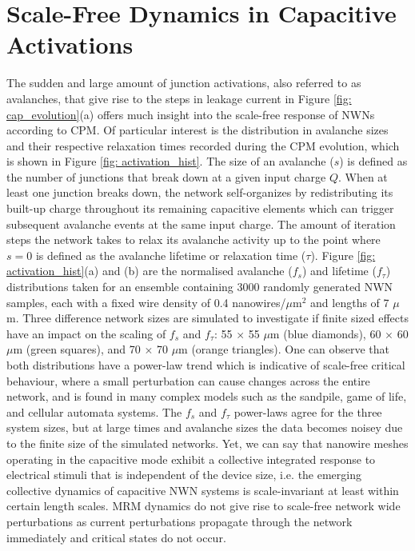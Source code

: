 \section{Scale-Free Dynamics in Capacitive Activations}
\label{Sec: cpm_avalanches}
The sudden and large amount of junction activations, also referred to as avalanches, that give rise to the steps in leakage current in Figure \ref{fig: cap_evolution}(a) offers much insight into the scale-free response of NWNs according to CPM. Of particular interest is the distribution in avalanche sizes and their respective relaxation times recorded during the CPM evolution, which is shown in Figure \ref{fig: activation_hist}. The size of an avalanche ($s$) is defined as the number of junctions that break down at a given input charge $Q$. When at least one junction breaks down, the network self-organizes by redistributing its built-up charge throughout its remaining capacitive elements which can trigger subsequent avalanche events at the same input charge. The amount of iteration steps the network takes to relax its avalanche activity up to the point where $s = 0$ is defined as the avalanche lifetime or relaxation time ($\tau$). Figure \ref{fig: activation_hist}(a) and (b) are the normalised avalanche ($f_s$) and lifetime ($f_{\tau}$) distributions taken for an ensemble containing 3000 randomly generated NWN samples, each with a fixed wire density of 0.4 nanowires/$\mu$m$^2$ and lengths of 7 $\mu$m. Three difference network sizes are simulated to investigate if finite sized effects have an impact on the scaling of $f_s$ and $f_{\tau}$: 55 $\times$ 55 $\mu$m (blue diamonds), 60 $\times$ 60 $\mu$m (green squares), and 70 $\times$ 70 $\mu$m (orange triangles). One can observe that both distributions have a power-law trend which is indicative of scale-free critical behaviour, where a small perturbation can cause changes across the entire network, and is found in many complex models such as the sandpile, game of life, and cellular automata systems\cite{bak1988}. The $f_s$ and $f_{\tau}$ power-laws agree for the three system sizes, but at large times and avalanche sizes the data becomes noisey due to the finite size of the simulated networks. Yet, we can say that nanowire meshes operating in the capacitive mode exhibit a collective integrated response to electrical stimuli that is independent of the device size, i.e. the emerging collective dynamics of capacitive NWN systems is scale-invariant at least within certain length scales. MRM dynamics do not give rise to scale-free network wide perturbations as current perturbations propagate through the network immediately and critical states do not occur. 

